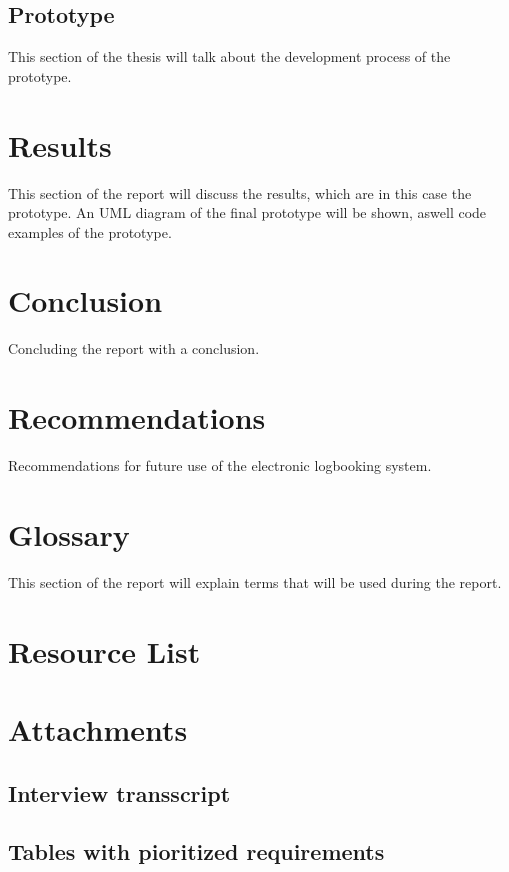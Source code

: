 \documentclass[paper=a4, fontsize=11pt,twoside]{scrartcl}	%
\begin{document}
\subsection{Prototype}
This section of the thesis will talk about the development process of the prototype.

\newpage
\section{Results}
This section of the report will discuss the results, which are in this case the prototype. An UML diagram of the final prototype will be shown, aswell code examples of the prototype.

\newpage
\section{Conclusion}
Concluding the report with a conclusion.
\newpage
\section{Recommendations}
Recommendations for future use of the electronic logbooking system.
\newpage

\section{Glossary}
This section of the report will explain terms that will be used during the report. 


\newpage

\section{Resource List}


\newpage

\section{Attachments}

\subsection{Interview transscript}


\subsection{Tables with pioritized requirements}




\end{document}
